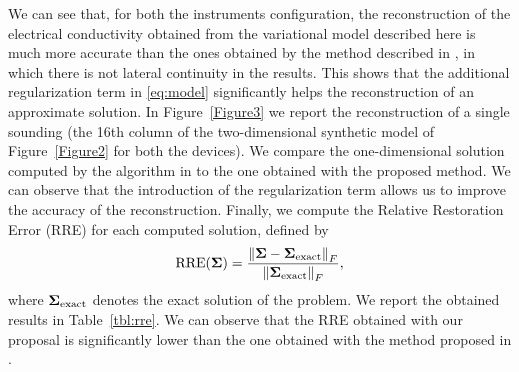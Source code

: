 \documentclass[final,leqno]{siamltex}
\newcommand{\norm}[1]{\left\| #1 \right\|}
\newcommand{\Sigmab}{\mathbf{\Sigma}}
\begin{document}
We can see that, for both the instruments configuration, the reconstruction of the electrical conductivity obtained from the variational model described here is much more accurate than the ones obtained by the method described in \cite{ddrv19}, in which there is not lateral continuity in the results. This shows that the additional regularization term in \eqref{eq:model} significantly helps the reconstruction of an approximate solution. In Figure~\ref{Figure3} we report the reconstruction of a single sounding (the
16th column of the two-dimensional synthetic model of Figure~\ref{Figure2} for both the devices). We compare the one-dimensional solution computed by the algorithm in \cite{ddrv19} to the one obtained with the proposed method. We can observe that the introduction of the regularization term allows us to improve the accuracy of the reconstruction. Finally, we compute the Relative Restoration Error (RRE) for each computed solution, defined by
$$
{\rm RRE}(\Sigmab)=\frac{\norm{\Sigmab-\Sigmab_{\rm exact}}_F}{\norm{\Sigmab_{\rm exact}}_F},
$$
where $\Sigmab_{\rm exact}$ denotes the exact solution of the problem. We report the obtained results in Table~\ref{tbl:rre}. We can observe that the RRE obtained with our proposal is significantly lower than the one obtained with the method proposed in \cite{ddrv19}.
\end{document}
